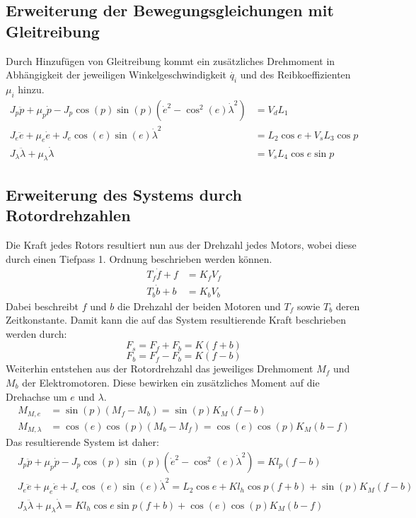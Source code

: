 \documentclass{article}
\begin{document}
	\subsection{Erweiterung der Bewegungsgleichungen mit Gleitreibung}
	Durch Hinzufügen von Gleitreibung kommt ein zusätzliches Drehmoment in Abhängigkeit der jeweiligen Winkelgeschwindigkeit $\dot{q_i}$ und des Reibkoeffizienten $\mu_i$  hinzu.
	\begin{align}
	J_p \ddot{p} + \mu_p \dot{p} - J_p \cos (p) \sin (p) (\dot{e}^2- \cos^2 (e) \dot{\lambda}^2) &= V_d L_1\\
	J_e\ddot{e} + \mu_e \dot{e} + J_e \cos (e) \sin (e) \dot{\lambda}^2 
	&= L_2 \cos e + V_s L_3 \cos p\\
	J_\lambda \ddot{\lambda} + \mu_\lambda \dot{\lambda} &= V_s L_4 \cos e \sin p
	\end{align}
	\subsection{Erweiterung des Systems durch Rotordrehzahlen}
	Die Kraft jedes Rotors resultiert nun aus der Drehzahl jedes Motors, wobei diese durch einen Tiefpass 1. Ordnung beschrieben werden können.
	\begin{align}
	T_f \dot{f} + f &= K_f V_f\\
	T_b \dot{b} + b &= K_b V_b
	\end{align}
	Dabei beschreibt $f$ und $b$ die Drehzahl der beiden Motoren und $T_f$ sowie $T_b$ deren Zeitkonstante.
	Damit kann die auf das System resultierende Kraft beschrieben werden durch:
	\begin{equation}
	F_s = F_f + F_b = K (f + b)
	\end{equation}
	\begin{equation}
	F_b = F_f - F_b = K (f - b)
	\end{equation}
	Weiterhin entstehen aus der Rotordrehzahl das jeweiliges Drehmoment $M_f$ und $M_b$ der Elektromotoren. Diese bewirken ein zusätzliches Moment auf die Drehachse um $e$ und $\lambda$.
	\begin{align}
	M_{M,e} &= \sin (p) (M_f - M_b) =\sin (p) K_M (f-b) \\
	M_{M,\lambda} &= \cos (e) \cos (p) (M_b - M_f) =\cos (e) \cos (p) K_M (b-f)
	\end{align}
	Das resultierende System ist daher:
	\begin{align}
	&J_p \ddot{p} + \mu_p \dot{p} - J_p \cos (p) \sin (p) (\dot{e}^2- \cos^2 (e) \dot{\lambda}^2) = K l_p (f - b)\\
	&J_e\ddot{e} + \mu_e \dot{e} + J_e \cos (e) \sin (e) \dot{\lambda}^2 
	= L_2 \cos e + K l_h \cos p (f + b) + \sin (p) K_M (f-b)\\
	&J_\lambda \ddot{\lambda} + \mu_\lambda \dot{\lambda} = K l_h \cos e \sin p (f + b) +\cos (e) \cos (p) K_M (b-f)
	\end{align}
	
\end{document}
